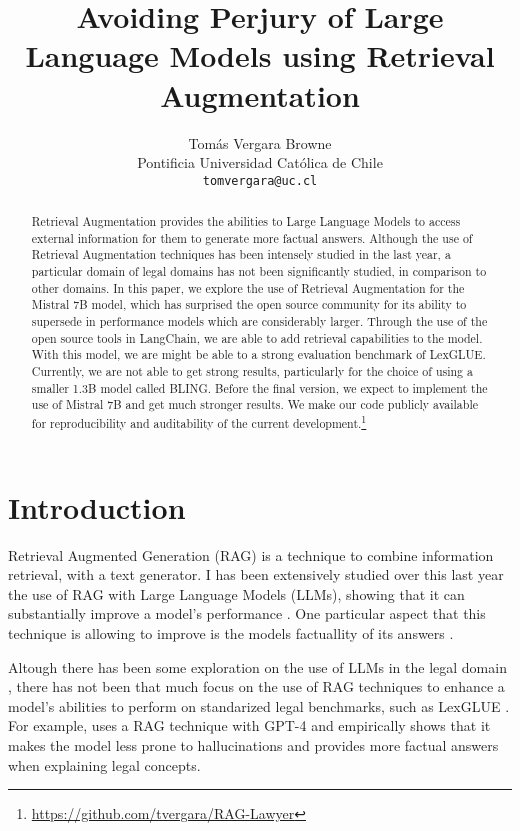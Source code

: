 \documentclass[11pt]{article}
\title{Avoiding Perjury of Large Language Models using Retrieval Augmentation}
\author{Tomás Vergara Browne \\
  Pontificia Universidad Católica de Chile \\
  \texttt{tomvergara@uc.cl} \\}
\begin{document}
\maketitle
\begin{abstract}
  Retrieval Augmentation provides the abilities to Large Language Models to access external information for them to generate more factual answers. Although the use of Retrieval Augmentation techniques has been intensely studied in the last year, a particular domain of legal domains has not been significantly studied, in comparison to other domains. In this paper, we explore the use of Retrieval Augmentation for the Mistral 7B model, which has surprised the open source community for its ability to supersede in performance models which are considerably larger. Through the use of the open source tools in LangChain, we are able to add retrieval capabilities to the model. With this model, we are might be able to a strong evaluation benchmark of LexGLUE. Currently, we are not able to get strong results, particularly for the choice of using a smaller 1.3B model called BLING. Before the final version, we expect to implement the use of Mistral 7B and get much stronger results. We make our code publicly available for reproducibility and auditability of the current development.\footnote{\href{https://github.com/tvergara/RAG-Lawyer}{https://github.com/tvergara/RAG-Lawyer}}
\end{abstract}

\section{Introduction}
Retrieval Augmented Generation (RAG) is a technique to combine information retrieval, with a text generator. I has been extensively studied over this last year the use of RAG with Large Language Models (LLMs), showing that it can substantially improve a model's performance \cite{ram2023context}. One particular aspect that this technique is allowing to improve is the models factuallity of its answers \cite{lewis2020retrieval}.

Altough there has been some exploration on the use of LLMs in the legal domain \cite{chalkidis2020legal}, there has not been that much focus on the use of RAG techniques to enhance a model's abilities to perform on standarized legal benchmarks, such as LexGLUE \cite{chalkidis-etal-2022-lexglue}. For example, \cite{savelka2023explaining} uses a RAG technique with GPT-4 and empirically shows that it makes the model less prone to hallucinations and provides more factual answers when explaining legal concepts.
\end{document}
